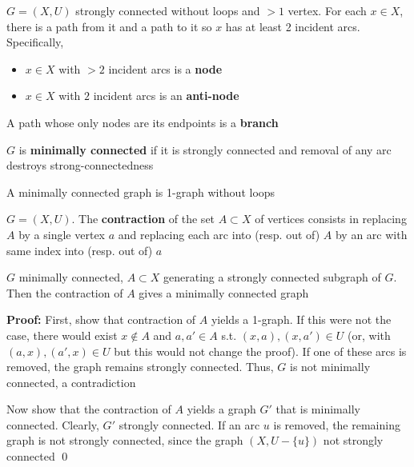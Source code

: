 \documentclass[aspectratio=169]{beamer}
\begin{document}
\begin{frame}
\begin{definition}
$G=(X,U)$ strongly connected without loops and $>1$ vertex. For each $x\in X$, there is a path from it and a path to it so $x$ has at least 2 incident arcs. Specifically,
\begin{itemize}
\item $x\in X$ with $>2$ incident arcs is a \textbf{node}
\item $x\in X$ with $2$ incident arcs is an \textbf{anti-node}
\end{itemize}
A path whose only nodes are its endpoints is a \textbf{branch}
\end{definition}
\vfill
\begin{definition}
$G$ is \textbf{minimally connected} if it is strongly connected and removal of any arc destroys strong-connectedness
\end{definition}
A minimally connected graph is 1-graph without loops
\vfill
\begin{definition}[Contraction]
$G=(X,U)$. The \textbf{contraction} of the set $A\subset X$ of vertices consists in replacing $A$ by a single vertex $a$ and replacing each arc into (resp. out of) $A$ by an arc with same index into (resp. out of) $a$
\end{definition}
\end{frame}


\begin{frame}
\begin{theorem}
$G$ minimally connected, $A\subset X$ generating a strongly connected subgraph of $G$. Then the contraction of $A$ gives a minimally connected graph
\end{theorem}
\vfill
\textbf{Proof:}
First, show that contraction of $A$ yields a 1-graph. 
If this were not the case, there would exist $x\not\in A$ and $a,a'\in A$ s.t. $(x,a),(x,a')\in U$ (or, with $(a,x),(a',x)\in U$ but this would not
change the proof). 
If one of these arcs is removed, the graph remains strongly
connected. Thus, $G$ is not minimally connected, a contradiction

\vskip1cm
Now show that the contraction of $A$ yields a graph $G'$ that is minimally connected. Clearly, $G'$ strongly connected. If an arc $u$ is removed, the remaining graph is not strongly connected, since the graph
$(X,U-\{u\})$ not strongly connected \qed
\end{frame}
\end{document}
